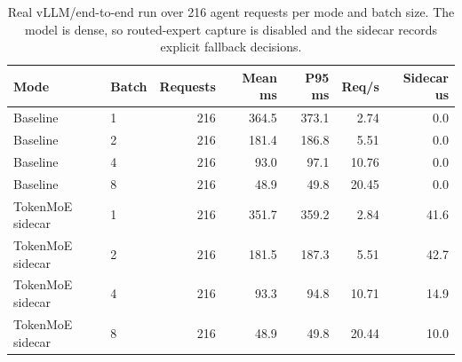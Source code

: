 \begin{table}[t]
\centering
\caption{Real vLLM/\Qwen end-to-end run over 216 agent requests per mode and batch size. The model is dense, so routed-expert capture is disabled and the sidecar records explicit fallback decisions.}
\label{tab:vllm-summary}
\begin{tabular}{llrrrrr}
\toprule
Mode & Batch & Requests & Mean ms & P95 ms & Req/s & Sidecar us \\
\midrule
Baseline & 1 & 216 & 364.5 & 373.1 & 2.74 & 0.0 \\
Baseline & 2 & 216 & 181.4 & 186.8 & 5.51 & 0.0 \\
Baseline & 4 & 216 & 93.0 & 97.1 & 10.76 & 0.0 \\
Baseline & 8 & 216 & 48.9 & 49.8 & 20.45 & 0.0 \\
TokenMoE sidecar & 1 & 216 & 351.7 & 359.2 & 2.84 & 41.6 \\
TokenMoE sidecar & 2 & 216 & 181.5 & 187.3 & 5.51 & 42.7 \\
TokenMoE sidecar & 4 & 216 & 93.3 & 94.8 & 10.71 & 14.9 \\
TokenMoE sidecar & 8 & 216 & 48.9 & 49.8 & 20.44 & 10.0 \\
\bottomrule
\end{tabular}
\end{table}
